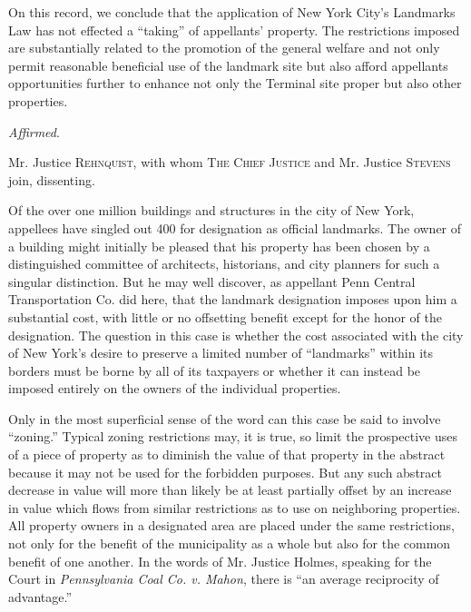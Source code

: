 On this record, we conclude that the application of New York City's Landmarks
Law has not effected a ``taking'' of appellants' property. The restrictions
imposed are substantially related to the promotion of the general welfare and
not only permit reasonable beneficial use of the landmark site but also afford
appellants opportunities further to enhance not only the Terminal site proper
but also other properties.

\textit{Affirmed}.

\opinion Mr. Justice \textsc{Rehnquist}, with whom \textsc{The Chief Justice}
and Mr. Justice \textsc{Stevens} join, dissenting.

Of the over one million buildings and structures in the city of New York,
appellees have singled out 400 for designation as official landmarks. The owner
of a building might initially be pleased that his property has been chosen by a
distinguished committee of architects, historians, and city planners for such a
singular distinction. But he may well discover, as appellant Penn Central
Transportation Co. did here, that the landmark designation imposes upon him a
substantial cost, with little or no offsetting benefit except for the honor of
the designation. The question in this case is whether the cost associated with
the city of New York's desire to preserve a limited number of ``landmarks''
within its borders must be borne by all of its taxpayers or whether it can
instead be imposed entirely on the owners of the individual properties.

Only in the most superficial sense of the word can this case be said to involve
``zoning.'' Typical zoning restrictions may, it is true, so limit the
prospective uses of a piece of property as to diminish the value of that
property in the abstract because it may not be used for the forbidden purposes.
But any such abstract decrease in value will more than likely be at least
partially offset by an increase in value which flows from similar restrictions
as to use on neighboring properties. All property owners in a designated area
are placed under the same restrictions, not only for the benefit of the
municipality as a whole but also for the common benefit of one another. In the
words of Mr. Justice Holmes, speaking for the Court in \textit{Pennsylvania Coal
Co. v. Mahon}, there is ``an average reciprocity of advantage.''

